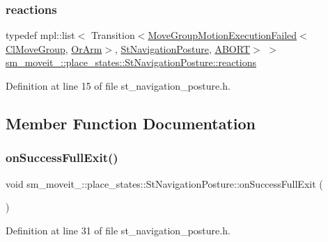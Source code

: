 \subsubsection{\texorpdfstring{reactions}{reactions}}
{\footnotesize\ttfamily typedef mpl\+::list$<$ Transition$<$\hyperlink{structmoveit__z__client_1_1MoveGroupMotionExecutionFailed}{Move\+Group\+Motion\+Execution\+Failed}$<$\hyperlink{classmoveit__z__client_1_1ClMoveGroup}{Cl\+Move\+Group}, \hyperlink{classsm__moveit__4_1_1OrArm}{Or\+Arm}$>$, \hyperlink{structsm__moveit__4_1_1place__states_1_1StNavigationPosture}{St\+Navigation\+Posture}, \hyperlink{classABORT}{A\+B\+O\+RT}$>$ $>$ \hyperlink{structsm__moveit__4_1_1place__states_1_1StNavigationPosture_a2588352d77d56f7a1f3df49fe37629d4}{sm\+\_\+moveit\+\_\+::place\+\_\+states\+::\+St\+Navigation\+Posture\+::reactions}}



Definition at line 15 of file st\+\_\+navigation\+\_\+posture.\+h.



\subsection{Member Function Documentation}
\mbox{\label{structsm__moveit__4_1_1place__states_1_1StNavigationPosture_a95ab74dae51538aeae46f71b515bc61e}} 
\subsubsection{\texorpdfstring{on\+Success\+Full\+Exit()}{onSuccessFullExit()}}
{\footnotesize\ttfamily void sm\+\_\+moveit\+\_\+::place\+\_\+states\+::\+St\+Navigation\+Posture\+::on\+Success\+Full\+Exit (\begin{DoxyParamCaption}{ }\end{DoxyParamCaption})\hspace{0.3cm}{\ttfamily [inline]}}



Definition at line 31 of file st\+\_\+navigation\+\_\+posture.\+h.



